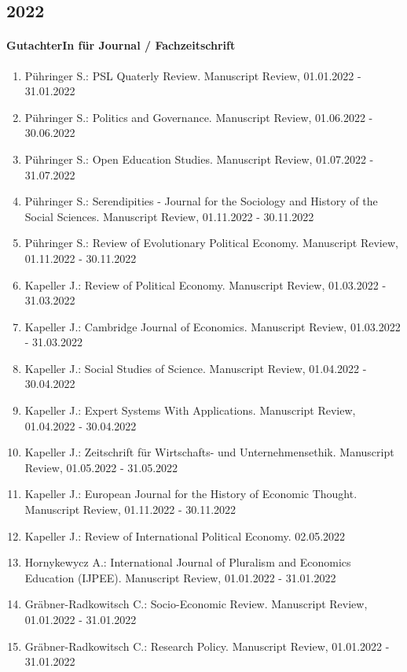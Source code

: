 \subsection*{2022} 
\paragraph{GutachterIn für Journal / Fachzeitschrift} 
\begin{enumerate}[leftmargin=*, labelsep=0.5cm] 
 	 \item Pühringer S.: PSL Quaterly Review. Manuscript Review, 01.01.2022 - 31.01.2022 
	 \item Pühringer S.: Politics and Governance. Manuscript Review, 01.06.2022 - 30.06.2022 
	 \item Pühringer S.: Open Education Studies. Manuscript Review, 01.07.2022 - 31.07.2022 
	 \item Pühringer S.: Serendipities - Journal for the Sociology and History of the Social Sciences. Manuscript Review, 01.11.2022 - 30.11.2022 
	 \item Pühringer S.: Review of Evolutionary Political Economy. Manuscript Review, 01.11.2022 - 30.11.2022 
	 \item Kapeller J.: Review of Political Economy. Manuscript Review, 01.03.2022 - 31.03.2022 
	 \item Kapeller J.: Cambridge Journal of Economics. Manuscript Review, 01.03.2022 - 31.03.2022 
	 \item Kapeller J.: Social Studies of Science. Manuscript Review, 01.04.2022 - 30.04.2022 
	 \item Kapeller J.: Expert Systems With Applications. Manuscript Review, 01.04.2022 - 30.04.2022 
	 \item Kapeller J.: Zeitschrift für Wirtschafts- und Unternehmensethik. Manuscript Review, 01.05.2022 - 31.05.2022 
	 \item Kapeller J.: European Journal for the History of Economic Thought. Manuscript Review, 01.11.2022 - 30.11.2022 
	 \item Kapeller J.: Review of International Political Economy. 02.05.2022 
	 \item Hornykewycz A.: International Journal of Pluralism and Economics Education (IJPEE). Manuscript Review, 01.01.2022 - 31.01.2022 
	 \item Gräbner-Radkowitsch C.: Socio-Economic Review. Manuscript Review, 01.01.2022 - 31.01.2022 
	 \item Gräbner-Radkowitsch C.: Research Policy. Manuscript Review, 01.01.2022 - 31.01.2022 

\end{enumerate}
